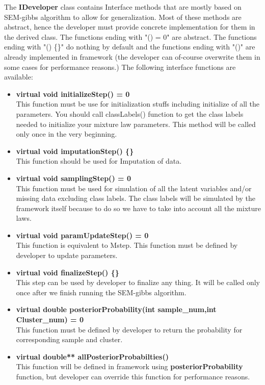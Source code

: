 \documentclass[a4paper,11pt]{article}
\begin{document}
The {\bf IDeveloper} class contains Interface methods that 
are mostly based on SEM-gibbs algorithm to allow for generalization. Most of these methods are abstract, hence the developer must provide
concrete implementation for them in the derived class. The functions ending with "() = 0" are abstract. The functions ending with "() \{\}" do nothing by default and the functions
ending with "()" are already implemented in framework (the developer can of-course
overwrite them in some cases for performance reasons.) The following interface functions are available:
\begin{itemize}
\item {\bf virtual void initializeStep() = 0} \\
This function must be use for initialization stuffs including initialize of all
the parameters. You should call classLabels() function to get the class labels needed to initialize your mixture law parameters.
This method will be called only once in the very beginning.
\item {\bf virtual void imputationStep() \{\}}\\
This function should be used for Imputation of data. 
\item {\bf virtual void samplingStep() = 0} \\
This function must be used for simulation of all the latent variables and/or missing data
excluding class labels. The class labels will be simulated by the framework itself because to do so
we have to take into account all the mixture laws. 
\item {\bf virtual void paramUpdateStep() = 0}\\
This function is equivalent to Mstep. This function must be defined by developer to update parameters.
\item {\bf virtual void finalizeStep() \{\}}\\
This step can be used by developer to finalize any thing. It will be called only once after we
finish running the SEM-gibbs algorithm.
\item {\bf virtual double posteriorProbability(int sample\_num,int Cluster\_num) = 0}\\
This function must be defined by developer to return the probability for corresponding sample and cluster.
\item {\bf virtual double** allPosteriorProbabilties()}\\
This function will be defined in framework using {\bf posteriorProbability} function, but developer
can override this function for performance reasons.

\end{itemize}
\end{document}
